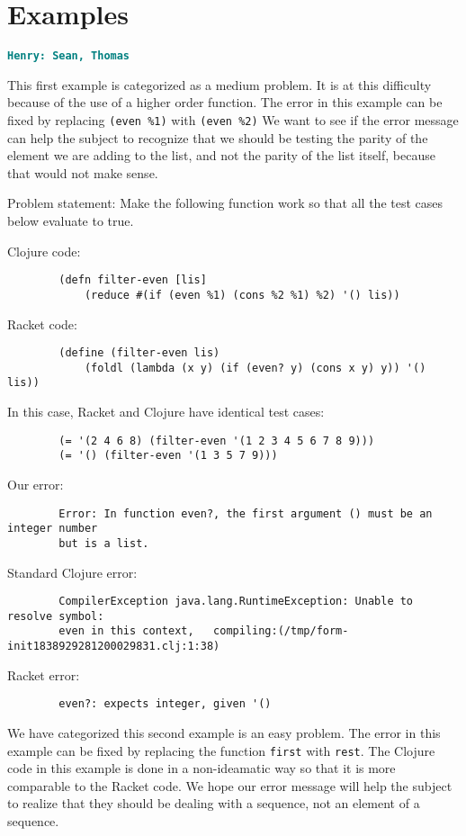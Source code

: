 \documentclass[12pt]{article}
\newcommand{\comment}[1]{{\bf \tt  {#1}}}
\newcommand{\hfcomment}[1]{\textcolor{Teal}{\comment{Henry: {#1}}}}
\begin{document}
\section{Examples}\label{sec:examples}
	\hfcomment{Sean, Thomas}
	
	This first example is categorized as a medium problem. 
	It is at this difficulty because of the use of a higher order function.
	The error in this example can be fixed by replacing \texttt{(even \%1)} with \texttt{(even \%2)} 
	We want to see if the error message can help the subject to recognize that we should be testing the parity of the element we are adding to the list, and not the parity of the list itself, because that would not make sense. 
	
	Problem statement:
		Make the following function work so that all the test cases below evaluate to true.
	
	Clojure code:
\begin{verbatim}
		(defn filter-even [lis] 
			(reduce #(if (even %1) (cons %2 %1) %2) '() lis))
\end{verbatim}
	Racket code:
\begin{verbatim}
		(define (filter-even lis) 
			(foldl (lambda (x y) (if (even? y) (cons x y) y)) '() lis))
\end{verbatim}
	In this case, Racket and Clojure have identical test cases: 

\begin{verbatim}
		(= '(2 4 6 8) (filter-even '(1 2 3 4 5 6 7 8 9)))
		(= '() (filter-even '(1 3 5 7 9)))
\end{verbatim}

	Our error:
\begin{verbatim}
		Error: In function even?, the first argument () must be an integer number 
		but is a list.
\end{verbatim}

	Standard Clojure error:
\begin{verbatim}
		CompilerException java.lang.RuntimeException: Unable to resolve symbol: 
		even in this context, 	compiling:(/tmp/form-init1838929281200029831.clj:1:38) 
\end{verbatim}

	Racket error:
\begin{verbatim}
		even?: expects integer, given '()
\end{verbatim}


	We have categorized this second example is an easy problem.
	The error in this example can be fixed by replacing the function \texttt{first} with \texttt{rest}.
	The Clojure code in this example is done in a non-ideamatic way so that it is more comparable to the Racket code.
	We hope our error message will help the subject to realize that they should be dealing with a sequence, not an element of a sequence. 
	
\end{document}
